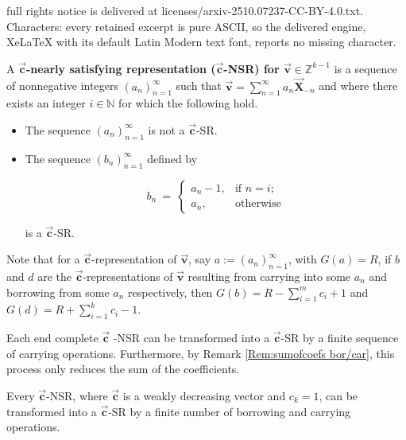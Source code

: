 \documentclass[10pt,a4paper]{amsart}
\newcommand{\N}{{\mathbb N}}  %
\newcommand{\X}{\vtr{X}}
\newcommand{\vtr}[1]{\vec{\mathbf{#1}}}
\begin{document}
full rights notice is delivered at licenses/arxiv-2510.07237-CC-BY-4.0.txt. Characters: every retained excerpt is pure ASCII, so the delivered engine, XeLaTeX with its default Latin Modern text font, reports no missing character.
\begin{definition}
\label{defintion:NSR}
    A \textbf{$\vtr{c}$-nearly satisfying representation ($\vtr{c}$-NSR) for $\vtr{v} \in \mathbb{Z}^{k-1}$} is a sequence of nonnegative integers $(a_n)_{n=1}^\infty$ such that $\vtr{v}=\sum_{n=1}^\infty a_n \X_{-n}$ and where there exists an integer $i\in \N $ for which the following hold. 
        \begin{itemize}
            \item The sequence $(a_n)_{n=1}^\infty$ is not a $\vtr{c}$-SR.
            \item The sequence $(b_n)_{n=1}^\infty$ defined by
            
            $$b_n\ =\ \begin{cases}
                a_n-1, & \text{if }n=i; \\
                a_n, & \text{otherwise}
            \end{cases}$$

            \noindent is a $\vtr{c}$-SR.
        \end{itemize}
        
\end{definition}

\begin{remark}\label{Rem:sumofcoefs bor/car}
    Note that for a $\vtr{c}$-representation of $\vtr{v}$, say $a:=(a_n)_{n=1}^\infty$, with $G(a)=R$, if $b$ and $d$ are the $\vtr{c}$-representations of $\vtr{v}$ resulting from carrying into some $a_n$ and borrowing from some $a_n$ respectively, then $G(b)=R - \sum_{i=1}^m c_i + 1$ and $G(d)=R + \sum_{i=1}^kc_i -1$.
\end{remark}

\begin{proposition}\label{prop:End complete}
    Each end complete $\vtr{c}$ -NSR can be transformed into a $\vtr{c}$-SR by a finite sequence of carrying operations. Furthermore, by Remark \textcolor{blue}{\ref{Rem:sumofcoefs bor/car}}, this process only reduces the sum of the coefficients.
\end{proposition}

\begin{proposition}\label{prop: general cSR}
Every $\vtr{c}$-NSR, where $\vtr{c}$ is a weakly decreasing vector and $c_k = 1$, can be transformed into a $\vtr{c}$-SR by a finite number of borrowing and carrying operations.
\end{proposition}
\end{document}
